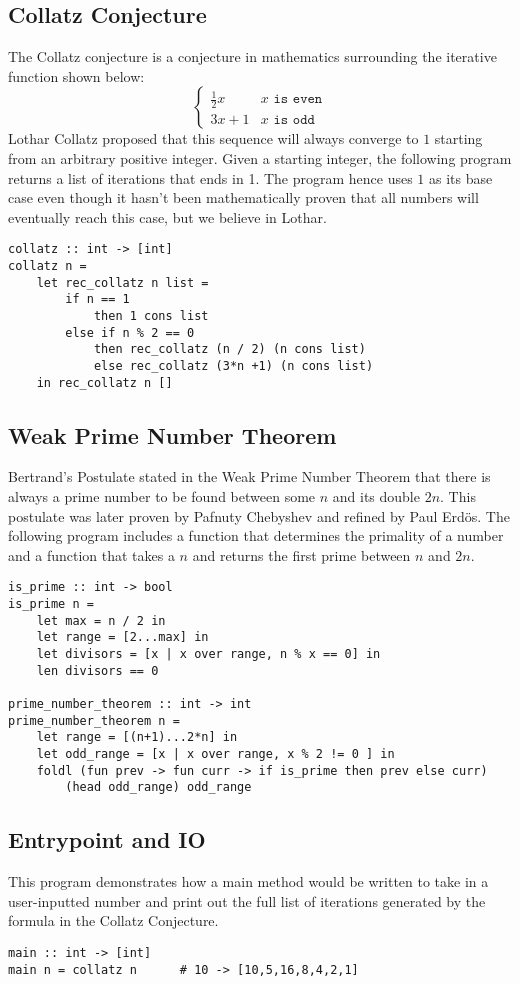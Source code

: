 \documentclass[5pt]{article}
\begin{document}
\subsection{Collatz Conjecture}
The Collatz conjecture is a conjecture in mathematics surrounding the iterative 
function shown below:
$$ \begin{cases} 
      \frac{1}{2}x & x \texttt{ is even} \\
      3x + 1 & x \texttt{ is odd} 
   \end{cases}
$$
Lothar Collatz proposed that this sequence will always converge to $1$ starting 
from an arbitrary positive integer. Given a starting integer, the following 
program returns a list of iterations that ends in 1. The program hence uses $1$ 
as its base case even though it hasn't been mathematically proven that all 
numbers will eventually reach this case, but we believe in Lothar.
\begin{lstlisting}[language=rippl]
collatz :: int -> [int]
collatz n =
    let rec_collatz n list =
        if n == 1
            then 1 cons list
        else if n % 2 == 0
            then rec_collatz (n / 2) (n cons list)
            else rec_collatz (3*n +1) (n cons list)
    in rec_collatz n []
\end{lstlisting}
\subsection{Weak Prime Number Theorem}
Bertrand's Postulate stated in the Weak Prime Number Theorem that there is 
always a prime number to be found between some $n$ and its double $2n$. This 
postulate was later proven by Pafnuty Chebyshev and refined by Paul Erd\"{o}s. 
The following program includes a function that determines the primality of a 
number and a function that takes a $n$ and returns the first prime between 
$n$ and $2n$.
\begin{lstlisting}[language=rippl]
is_prime :: int -> bool
is_prime n =
    let max = n / 2 in
    let range = [2...max] in
    let divisors = [x | x over range, n % x == 0] in
    len divisors == 0
    
prime_number_theorem :: int -> int
prime_number_theorem n =
    let range = [(n+1)...2*n] in
    let odd_range = [x | x over range, x % 2 != 0 ] in
    foldl (fun prev -> fun curr -> if is_prime then prev else curr)
        (head odd_range) odd_range
\end{lstlisting}
\subsection{Entrypoint and IO}
This program demonstrates how a main method would be written to take in a user-inputted number and print out the full list of iterations generated by the formula in the Collatz Conjecture.
\begin{lstlisting}[language=rippl]
main :: int -> [int]
main n = collatz n      # 10 -> [10,5,16,8,4,2,1]
\end{lstlisting}
\end{document}
